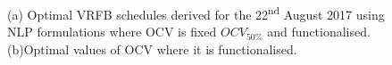 \documentclass[preprint,3p,review,authoryear,10pt]{elsarticle}
\begin{document}
\begin{figure}[!ht]
\centering
{}
\caption{(a) Optimal VRFB schedules derived for the 22\textsuperscript{nd} August 2017 using NLP formulations where OCV is fixed $OCV_{50\%}$ and functionalised. (b)Optimal values of OCV where it is functionalised.}
\end{figure}
\end{document}
